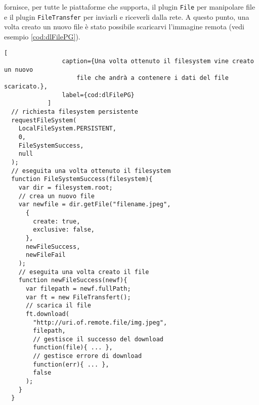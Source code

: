             \pg{} fornisce, per tutte le piattaforme che supporta, il plugin
            \texttt{File} per manipolare file e il plugin \texttt{FileTransfer}
            per inviarli e riceverli dalla rete. A questo punto, una volta
            creato un nuovo file è stato possibile scaricarvi l'immagine remota
            (vedi esempio \ref{cod:dlFilePG}).
            \begin{lstlisting}[
                caption={Una volta ottenuto il filesystem vine creato un nuovo
                    file che andrà a contenere i dati del file scaricato.},
                label={cod:dlFilePG}
            ]
  // richiesta filesystem persistente
  requestFileSystem(
    LocalFileSystem.PERSISTENT,
    0,
    FileSystemSuccess,
    null
  );
  // eseguita una volta ottenuto il filesystem
  function FileSystemSuccess(filesystem){
    var dir = filesystem.root;
    // crea un nuovo file
    var newfile = dir.getFile("filename.jpeg",
      {
        create: true,
        exclusive: false,
      },
      newFileSuccess,
      newFileFail
    );
    // eseguita una volta creato il file
    function newFileSuccess(newf){
      var filepath = newf.fullPath;
      var ft = new FileTransfert();
      // scarica il file
      ft.download(
        "http://uri.of.remote.file/img.jpeg",
        filepath,
        // gestisce il successo del download
        function(file){ ... },
        // gestisce errore di download
        function(err){ ... },
        false
      );
    }
  }
            \end{lstlisting}

